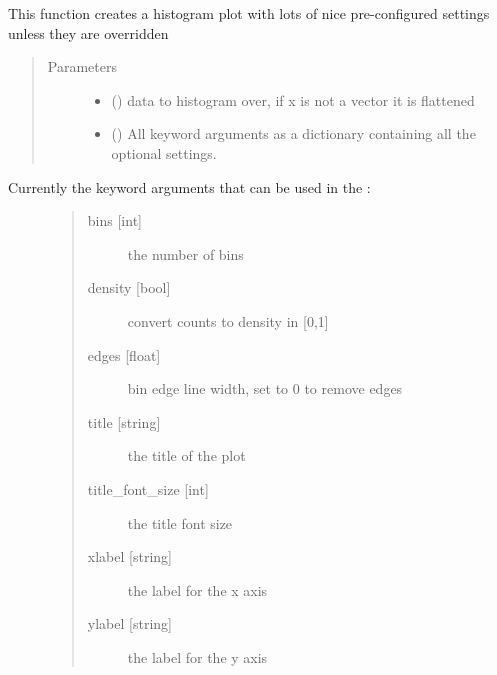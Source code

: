\documentclass[letterpaper,10pt,english]{sphinxmanual}
\begin{document}
\begin{fulllineitems}
\label{\detokenize{modules/dpt_tools:dpt_tools.hist}}
This function creates a histogram plot with lots of nice pre-configured settings unless they are overridden
\begin{quote}\begin{description}
\item[{Parameters}] \leavevmode\begin{itemize}
\item {} 
 () \textendash{} data to histogram over, if x is not a vector it is flattened

\item {} 
 () \textendash{} All keyword arguments as a dictionary containing all the optional settings.

\end{itemize}

\end{description}\end{quote}
\begin{description}
\item[{Currently the keyword arguments that can be used in the :}] \leavevmode\begin{quote}\begin{description}
\item[{bins {[}int{]}}] \leavevmode
the number of bins

\item[{density {[}bool{]}}] \leavevmode
convert counts to density in {[}0,1{]}

\item[{edges {[}float{]}}] \leavevmode
bin edge line width, set to 0 to remove edges

\item[{title {[}string{]}}] \leavevmode
the title of the plot

\item[{title\_font\_size {[}int{]}}] \leavevmode
the title font size

\item[{xlabel {[}string{]}}] \leavevmode
the label for the x axis

\item[{ylabel {[}string{]}}] \leavevmode
the label for the y axis


\end{description}
\end{quote}
\end{description}
\end{fulllineitems}
\end{document}
